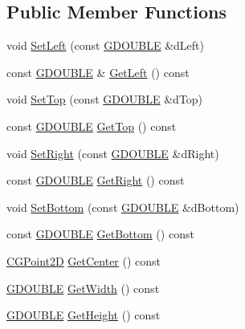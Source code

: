 \subsection*{Public Member Functions}
\begin{DoxyCompactItemize}
\item 
void \hyperlink{class_c_g_rect_a079147a4cc13fe4f24e76e7c0d2cdd63}{Set\+Left} (const \hyperlink{_g_types_8h_afd05ac85f90ee8e2a733928545462cd4}{G\+D\+O\+U\+B\+L\+E} \&d\+Left)
\item 
const \hyperlink{_g_types_8h_afd05ac85f90ee8e2a733928545462cd4}{G\+D\+O\+U\+B\+L\+E} \& \hyperlink{class_c_g_rect_a14cc75bae193e28562c3c96a59b2ca3a}{Get\+Left} () const 
\item 
void \hyperlink{class_c_g_rect_a6f1c072bd7e7dd875361c2e1d2fc69ed}{Set\+Top} (const \hyperlink{_g_types_8h_afd05ac85f90ee8e2a733928545462cd4}{G\+D\+O\+U\+B\+L\+E} \&d\+Top)
\item 
const \hyperlink{_g_types_8h_afd05ac85f90ee8e2a733928545462cd4}{G\+D\+O\+U\+B\+L\+E} \hyperlink{class_c_g_rect_a99cf14188922f6f4d1b3c45a53421da3}{Get\+Top} () const 
\item 
void \hyperlink{class_c_g_rect_a25a1ecbbf12fe1fe1915119617be493c}{Set\+Right} (const \hyperlink{_g_types_8h_afd05ac85f90ee8e2a733928545462cd4}{G\+D\+O\+U\+B\+L\+E} \&d\+Right)
\item 
const \hyperlink{_g_types_8h_afd05ac85f90ee8e2a733928545462cd4}{G\+D\+O\+U\+B\+L\+E} \hyperlink{class_c_g_rect_ac934c835d76b49f19da9c6a948396096}{Get\+Right} () const 
\item 
void \hyperlink{class_c_g_rect_a7a7544c1fda2fecc9c10c477e682086e}{Set\+Bottom} (const \hyperlink{_g_types_8h_afd05ac85f90ee8e2a733928545462cd4}{G\+D\+O\+U\+B\+L\+E} \&d\+Bottom)
\item 
const \hyperlink{_g_types_8h_afd05ac85f90ee8e2a733928545462cd4}{G\+D\+O\+U\+B\+L\+E} \hyperlink{class_c_g_rect_a9bce9ed26b45fe576edbeab65c4f1187}{Get\+Bottom} () const 
\item 
\hyperlink{class_c_g_point2_d}{C\+G\+Point2\+D} \hyperlink{class_c_g_rect_a36f9e78696de06f44e4396bb27c8881a}{Get\+Center} () const 
\item 
\hyperlink{_g_types_8h_afd05ac85f90ee8e2a733928545462cd4}{G\+D\+O\+U\+B\+L\+E} \hyperlink{class_c_g_rect_a70c4f73e53f6023f005060a86d0e3144}{Get\+Width} () const 
\item 
\hyperlink{_g_types_8h_afd05ac85f90ee8e2a733928545462cd4}{G\+D\+O\+U\+B\+L\+E} \hyperlink{class_c_g_rect_a6a49f2d20e23d800e390ca13ed1c9ea9}{Get\+Height} () const 

\end{DoxyCompactItemize}
